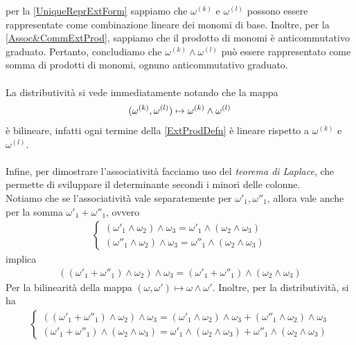 \documentclass[oneside, 11pt]{amsbook}
\makeatletter
\newcommand{\0}{{(0)}}
\newcommand{\3}{{(3)}}
\theoremstyle{colonplain}
\theoremstyle{colondefinition}
\theoremstyle{colonremark}
\numberwithin{equation}{chapter}
\renewcommand{\proofname}{Dimostrazione}
\renewenvironment{proof}[1][\proofname]{\par
  \pushQED{\qed}%
  \normalfont \topsep6\p@\@plus6\p@\relax
  \trivlist
  \item[\hskip\labelsep\bfseries #1:]\ignorespaces
}{%
  \popQED\endtrivlist\@endpefalse
}
\makeatother
\begin{document}
\begin{proof} per la \cref{UniqueReprExtForm} sappiamo che $\omega^{(k)}$ e $\omega^{(l)}$ possono essere rappresentate come combinazione lineare dei monomi di base. Inoltre, per la \cref{Assoc&CommExtProd}, sappiamo che il prodotto di monomi è anticommutativo graduato. Pertanto, concludiamo che $\omega^{(k)} \wedge \omega^{(l)}$ può essere rappresentato come somma di prodotti di monomi, ognuno anticommutativo graduato. \\ \\
La distributività si vede immediatamente notando che la mappa
\begin{align}
    (\omega^{(k)}, \omega^{(l)}) \mapsto \omega^{(k)} \wedge \omega^{(l)} \notag
\end{align}
è bilineare, infatti ogni termine della \eqref{ExtProdDefn} è lineare rispetto a $\omega^{(k)}$ e $\omega^{(l)}$. \\ \\
Infine, per dimostrare l'associatività facciamo uso del \textit{teorema di Laplace}, che permette di sviluppare il determinante secondi i minori delle colonne. \\
Notiamo che se l'associatività vale separatemente per $\omega'_1, \omega''_1$, allora vale anche per la somma $\omega'_1 + \omega''_1$, ovvero 
\begin{align}
    \begin{cases}
        (\omega'_1 \wedge \omega_2) \wedge \omega_3 = \omega'_1 \wedge (\omega_2 \wedge \omega_3) \\
        (\omega''_1 \wedge \omega_2) \wedge \omega_3 = \omega''_1 \wedge (\omega_2 \wedge \omega_3)
    \end{cases} 
\end{align}
implica
\begin{align}
    ((\omega'_1 + \omega''_1) \wedge \omega_2) \wedge \omega_3 = (\omega'_1 + \omega''_1) \wedge (\omega_2 \wedge \omega_3) 
\end{align}
Per la bilinearità della mappa $(\omega, \omega') \mapsto \omega \wedge \omega'$. Inoltre, per la distributività, si ha 
\begin{align}
    \begin{cases}
        ((\omega'_1 + \omega''_1) \wedge \omega_2) \wedge \omega_3 = (\omega'_1 \wedge \omega_2) \wedge \omega_3 + (\omega''_1 \wedge \omega_2) \wedge \omega_3 \\
        (\omega'_1 + \omega''_1) \wedge (\omega_2 \wedge \omega_3) = \omega'_1 \wedge (\omega_2 \wedge \omega_3) + \omega''_1 \wedge (\omega_2 \wedge \omega_3)

\end{cases}
\end{align}
\end{proof}
\end{document}
